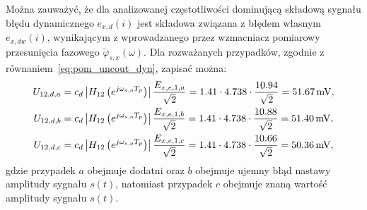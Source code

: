 Można zauważyć, że dla analizowanej częstotliwości dominującą składową sygnału błędu dynamicznego $e_{x,d}(i)$ jest składowa związana z błędem własnym $e_{x,dw}(i)$, wynikającym z wprowadzanego przez wzmacniacz pomiarowy przesunięcia fazowego $\tilde{\varphi}_{s,x}(\omega)$. Dla rozważanych przypadków, zgodnie z równaniem~\eqref{eq:pom_uncout_dyn}, zapisać można:
\begin{gather}
U_{12,d,a} = c_{d} \left| H_{12} \left(e^{j \omega_{s,o} T_{p}}\right) \right| \frac{E_{x,e,1,a}}{\sqrt{2}} = 1.41 \cdot 4.738 \cdot \frac{10.94}{\sqrt{2}} = \qty{51.67}{mV} \label{eq:pom_mono_dyn_unc_a}, \\
U_{12,d,b} = c_{d} \left| H_{12} \left(e^{j \omega_{s,o} T_{p}}\right) \right| \frac{E_{x,e,1,b}}{\sqrt{2}} = 1.41 \cdot 4.738 \cdot \frac{10.88}{\sqrt{2}} = \qty{51.40}{mV} \label{eq:pom_mono_dyn_unc_b}, \\
U_{12,d,c} = c_{d} \left| H_{12} \left(e^{j \omega_{s,o} T_{p}}\right) \right| \frac{E_{x,e,1,c}}{\sqrt{2}} = 1.41 \cdot 4.738 \cdot \frac{10.66}{\sqrt{2}} = \qty{50.36}{mV} \label{eq:pom_mono_dyn_unc_c},
\end{gather}
gdzie przypadek $a$ obejmuje dodatni oraz $b$ obejmuje ujemny błąd nastawy amplitudy sygnału $s(t)$, natomiast przypadek $c$ obejmuje znaną wartość amplitudy sygnału $s(t)$.

